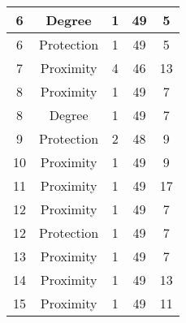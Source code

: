 \documentclass[results.tex]{subfiles}
\begin{document}
\begin{center}
\begin{tabular}{| c || c | c | c | c |}
            \hline
            6                       & Degree                       & 1                      & 49                      & 5                    \\
            \hline
            6                       & Protection                   & 1                      & 49                      & 5                    \\
            \hline
            7                       & Proximity                    & 4                      & 46                      & 13                   \\
            \hline
            8                       & Proximity                    & 1                      & 49                      & 7                    \\
            \hline
            8                       & Degree                       & 1                      & 49                      & 7                    \\
            \hline
            9                       & Protection                   & 2                      & 48                      & 9                    \\
            \hline
            10                      & Proximity                    & 1                      & 49                      & 9                    \\
            \hline
            11                      & Proximity                    & 1                      & 49                      & 17                   \\
            \hline
            12                      & Proximity                    & 1                      & 49                      & 7                    \\
            \hline
            12                      & Protection                   & 1                      & 49                      & 7                    \\
            \hline
            13                      & Proximity                    & 1                      & 49                      & 7                    \\
            \hline
            14                      & Proximity                    & 1                      & 49                      & 13                   \\
            \hline
            15                      & Proximity                    & 1                      & 49                      & 11                   \\

\end{tabular}
\end{center}
\end{document}
